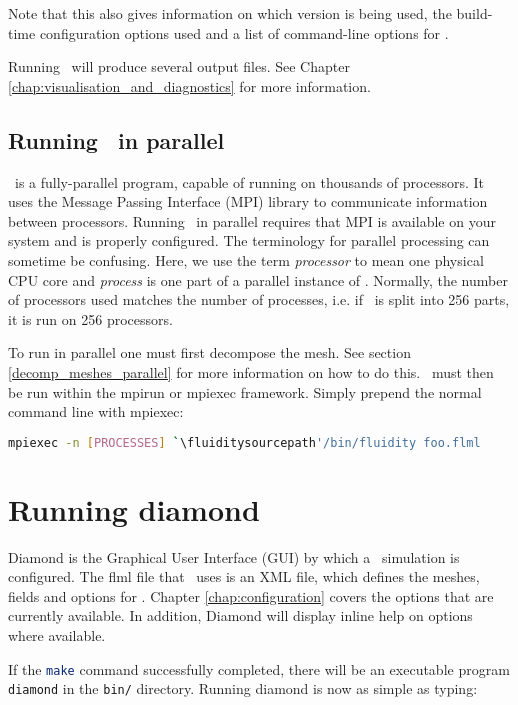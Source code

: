 Note that this also gives information on which version is being used, the
build-time configuration options used and a list of command-line options for
\fluidity. 

Running \fluidity\ will produce several output files. See Chapter \ref{chap:visualisation_and_diagnostics}
for more information.

\subsection{Running \fluidity\ in parallel}
\label{sec:running_fluidity_in_parallel}

\fluidity\ is a fully-parallel program, capable of running on thousands of
processors.  It uses the Message Passing Interface (MPI) library to communicate
information between processors. Running \fluidity\ in parallel requires that
MPI is available on your system and is properly configured. The terminology for
parallel processing can sometime be confusing.  Here, we use the term
\emph{processor} to mean one physical CPU core and \emph{process} is one part
of a parallel instance of \fluidity. Normally, the number of processors used
matches the number of processes, i.e. if \fluidity\ is split into 256 parts, it
is run on 256 processors.

To run in parallel one must first decompose the mesh. See section
\ref{decomp_meshes_parallel} for more information on how to do this. \fluidity\
must then be run within the mpirun or mpiexec framework. Simply prepend the
normal command line with mpiexec:
\begin{lstlisting}[language=bash]
mpiexec -n [PROCESSES] `\fluiditysourcepath'/bin/fluidity foo.flml
\end{lstlisting}

\section{Running diamond}
\label{sec:running_diamond}

Diamond is the Graphical User Interface (GUI) by which a \fluidity\ simulation
is configured. The flml file that \fluidity\ uses is an XML file, which defines
the meshes, fields and options for \fluidity. Chapter \ref{chap:configuration}
covers the options that are currently available. In addition, Diamond will
display inline help on options where available.

If the \lstinline[language=Bash]+make+ command successfully completed, there
will be an executable program \lstinline[language=Bash]+diamond+ in the
\lstinline[language=Bash]+bin/+ directory. Running diamond is now as simple as
typing:

